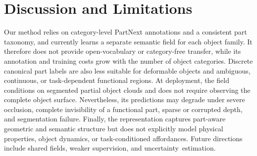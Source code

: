 \section{Discussion and Limitations}

Our method relies on category-level PartNext annotations and a consistent part taxonomy, and currently learns a separate semantic field for each object family. It therefore does not provide open-vocabulary or category-free transfer, while its annotation and training costs grow with the number of object categories. Discrete canonical part labels are also less suitable for deformable objects and ambiguous, continuous, or task-dependent functional regions. At deployment, the field conditions on segmented partial object clouds and does not require observing the complete object surface. Nevertheless, its predictions may degrade under severe occlusion, complete invisibility of a functional part, sparse or corrupted depth, and segmentation failure. Finally, the representation captures part-aware geometric and semantic structure but does not explicitly model physical properties, object dynamics, or task-conditioned affordances. Future directions include shared fields, weaker supervision, and uncertainty~estimation.
